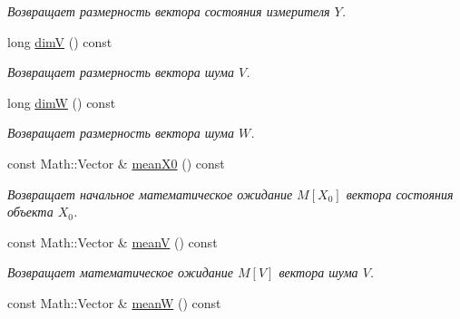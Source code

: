 \begin{DoxyCompactItemize}
\begin{DoxyCompactList}\small\item\em Возвращает размерность вектора состояния измерителя $Y$. \end{DoxyCompactList}\item 
long \hyperlink{class_core_1_1_task_a3efe253308c9128a1476cf178d789327}{dimV} () const \hypertarget{class_core_1_1_task_a3efe253308c9128a1476cf178d789327}{}\label{class_core_1_1_task_a3efe253308c9128a1476cf178d789327}

\begin{DoxyCompactList}\small\item\em Возвращает размерность вектора шума $V$. \end{DoxyCompactList}\item 
long \hyperlink{class_core_1_1_task_a31388d5efc8299d3728e85f1e2b72153}{dimW} () const \hypertarget{class_core_1_1_task_a31388d5efc8299d3728e85f1e2b72153}{}\label{class_core_1_1_task_a31388d5efc8299d3728e85f1e2b72153}

\begin{DoxyCompactList}\small\item\em Возвращает размерность вектора шума $W$. \end{DoxyCompactList}\item 
const Math\+::\+Vector \& \hyperlink{class_core_1_1_task_ad02fb470d5deee4ac63c9d0001136e79}{mean\+X0} () const \hypertarget{class_core_1_1_task_ad02fb470d5deee4ac63c9d0001136e79}{}\label{class_core_1_1_task_ad02fb470d5deee4ac63c9d0001136e79}

\begin{DoxyCompactList}\small\item\em Возвращает начальное математическое ожидание $M[X_0]$ вектора состояния объекта $X_0$. \end{DoxyCompactList}\item 
const Math\+::\+Vector \& \hyperlink{class_core_1_1_task_a63a1b33656c9ade43115ffcdf7202b50}{meanV} () const \hypertarget{class_core_1_1_task_a63a1b33656c9ade43115ffcdf7202b50}{}\label{class_core_1_1_task_a63a1b33656c9ade43115ffcdf7202b50}

\begin{DoxyCompactList}\small\item\em Возвращает математическое ожидание $M[V]$ вектора шума $V$. \end{DoxyCompactList}\item 
const Math\+::\+Vector \& \hyperlink{class_core_1_1_task_a5cc4b7f2c7876807ce9a78712bdc8147}{meanW} () const \hypertarget{class_core_1_1_task_a5cc4b7f2c7876807ce9a78712bdc8147}{}\label{class_core_1_1_task_a5cc4b7f2c7876807ce9a78712bdc8147}


\end{DoxyCompactItemize}
